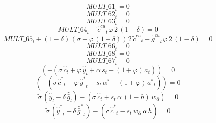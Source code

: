 \begin{dmath}
{MULT\_61}_{t}=0
\end{dmath}
\begin{dmath}
{MULT\_62}_{t}=0
\end{dmath}
\begin{dmath}
{MULT\_63}_{t}=0
\end{dmath}
\begin{dmath}
{MULT\_64}_{t}+{{\tilde c^{cu}}}_{t}\, {{\varphi}}\, 2\, \left(1-{{\delta}}\right)=0
\end{dmath}
\begin{dmath}
{MULT\_65}_{t}+\left(1-{{\delta}}\right)\, \left({{\sigma}}+{{\varphi}}\, \left(1-{{\delta}}\right)\right)\, 2\, {{\tilde c^{cu}}}_{t}+{{\tilde g^{cu}}}_{t}\, {{\varphi}}\, 2\, \left(1-{{\delta}}\right)=0
\end{dmath}
\begin{dmath}
{MULT\_66}_{t}=0
\end{dmath}
\begin{dmath}
{MULT\_68}_{t}=0
\end{dmath}
\begin{dmath}
{MULT\_67}_{t}=0
\end{dmath}
\begin{dmath}
\left(-\left({{\sigma}}\, {{\hat {\bar c}}}_{t}+{{\varphi}}\, {{\hat {\bar y}}}_{t}+{{\alpha}}\, {{\bar s}}_{t}-\left(1+{{\varphi}}\right)\, {{a}}_{t}\right)\right)=0
\end{dmath}
\begin{dmath}
\left(-\left({{\sigma}}\, {{\hat {\bar c}^*}}_{t}+{{\varphi}}\, {{\hat {\bar y}^*}}_{t}-{{\bar s}}_{t}\, {{\alpha^*}}-\left(1+{{\varphi}}\right)\, {{a^*}}_{t}\right)\right)=0
\end{dmath}
\begin{dmath}
{{\tilde{\sigma}}}\, \left({{\hat {\bar y}}}_{t}-{{\delta}}\, {{\hat {\bar g}}}_{t}\right)-\left({{\sigma}}\, {{\hat {\bar c}}}_{t}+{{\bar s}}_{t}\, {{\bar{\alpha}}}\, \left(1-{{h}}\right)\, {{w_{\bar{\alpha}}}}\right)=0
\end{dmath}
\begin{dmath}
{{\tilde{\sigma}}}\, \left({{\hat {\bar y}^*}}_{t}-{{\delta}}\, {{\hat {\bar g}^*}}_{t}\right)-\left({{\sigma}}\, {{\hat {\bar c}^*}}_{t}-{{\bar s}}_{t}\, {{w_{\bar{\alpha}}}}\, {{\bar{\alpha}}}\, {{h}}\right)=0
\end{dmath}
